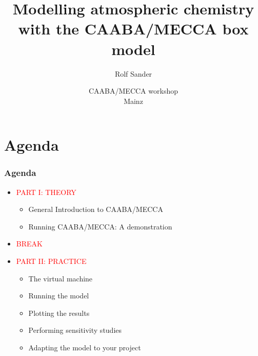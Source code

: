 \documentclass[t]{beamer}
\title[Modelling atmospheric chemistry with CAABA/MECCA]{Modelling
  atmospheric chemistry with the CAABA/MECCA box model}
\author[Rolf Sander] {Rolf Sander}
\institute{Max-Planck Institute for Chemistry, Mainz, Germany}
\date{CAABA/MECCA workshop\\
Mainz} %
\begin{document}

\begin{frame}%
  \titlepage
\end{frame}


\section{Agenda}

\begin{frame}

  \frametitle{Agenda}

  \begin{itemize}
  \item \textcolor{red}{PART I: THEORY}
    \begin{itemize}
    \item General Introduction to CAABA/MECCA
    \item Running CAABA/MECCA: A demonstration
    \end{itemize}
  \item \textcolor{red}{BREAK}
  \item \textcolor{red}{PART II: PRACTICE}
    \begin{itemize}
    \item The virtual machine
    \item Running the model
    \item Plotting the results
    \item Performing sensitivity studies
    \item Adapting the model to your project
    \end{itemize}
  \end{itemize}
  
\end{frame}




\end{document}
